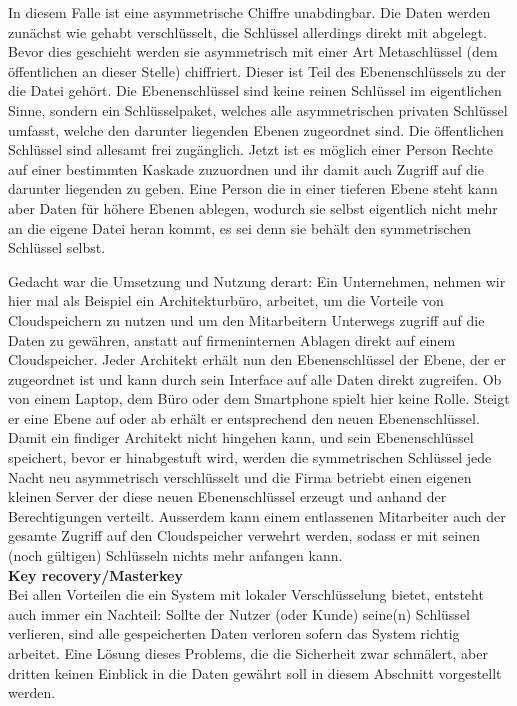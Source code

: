 \documentclass[12pt,a4paper,bibliography=totocnumbered,listof=totocnumbered]{scrartcl}
\begin{document}
In diesem Falle ist eine asymmetrische Chiffre unabdingbar. Die Daten werden zunächst wie gehabt verschlüsselt, die Schlüssel allerdings direkt mit abgelegt. Bevor dies geschieht werden sie asymmetrisch mit einer Art Metaschlüssel (dem öffentlichen an dieser Stelle) chiffriert. Dieser ist Teil des Ebenenschlüssels zu der die Datei gehört. Die Ebenenschlüssel sind keine reinen Schlüssel im eigentlichen Sinne, sondern ein Schlüsselpaket, welches alle asymmetrischen privaten Schlüssel umfasst, welche den darunter liegenden Ebenen zugeordnet sind. Die öffentlichen Schlüssel sind allesamt frei zugänglich. Jetzt ist es möglich einer Person Rechte auf einer bestimmten Kaskade zuzuordnen und ihr damit auch Zugriff auf die darunter liegenden zu geben. Eine Person die in einer tieferen Ebene steht kann aber Daten für höhere Ebenen ablegen, wodurch sie selbst eigentlich nicht mehr an die eigene Datei heran kommt, es sei denn sie behält den symmetrischen Schlüssel selbst.

Gedacht war die Umsetzung und Nutzung derart: Ein Unternehmen, nehmen wir hier mal als Beispiel ein Architekturbüro, arbeitet, um die Vorteile von Cloudspeichern zu nutzen und um den Mitarbeitern Unterwegs zugriff auf die Daten zu gewähren, anstatt auf firmeninternen Ablagen direkt auf einem Cloudspeicher. Jeder Architekt erhält nun den Ebenenschlüssel der Ebene, der er zugeordnet ist und kann durch sein Interface auf alle Daten direkt zugreifen. Ob von einem Laptop, dem Büro oder dem Smartphone spielt hier keine Rolle. Steigt er eine Ebene auf oder ab erhält er entsprechend den neuen Ebenenschlüssel. Damit ein findiger Architekt nicht hingehen kann, und sein Ebenenschlüssel speichert, bevor er hinabgestuft wird, werden die symmetrischen Schlüssel jede Nacht neu asymmetrisch verschlüsselt und die Firma betriebt einen eigenen kleinen Server der diese neuen Ebenenschlüssel erzeugt und anhand der Berechtigungen verteilt. Ausserdem kann einem entlassenen Mitarbeiter auch der gesamte Zugriff auf den Cloudspeicher verwehrt werden, sodass er mit seinen (noch gültigen) Schlüsseln nichts mehr anfangen kann.
\\\textbf{Key recovery/Masterkey}\\
Bei allen Vorteilen die ein System mit lokaler Verschlüsselung bietet, entsteht auch immer ein Nachteil: Sollte der Nutzer (oder Kunde) seine(n) Schlüssel verlieren, sind alle gespeicherten Daten verloren sofern das System richtig arbeitet. Eine Lösung dieses Problems, die die Sicherheit zwar schmälert, aber dritten keinen Einblick in die Daten gewährt soll in diesem Abschnitt vorgestellt werden.
\end{document}
